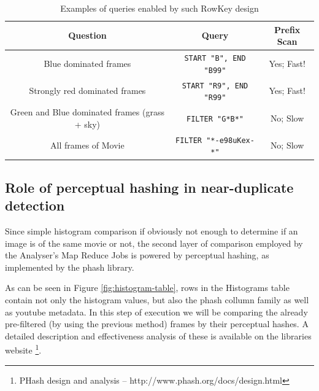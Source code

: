 \begin{table}[ch!]
  \centering
  \begin{tabular}{|c|c|c|}
  \hline
  \textbf{Question}                  & \textbf{Query}                    & Prefix Scan \\ \hline
  Blue dominated frames              & \verb|START "B", END "B99"|       & Yes; Fast! \\ \hline
  Strongly red dominated frames      & \verb|START "R9", END "R99"|      & Yes; Fast! \\ \hline
  Green and Blue dominated frames (grass + sky) & \verb|FILTER "G*B*"|   & No; Slow \\ \hline
  All frames of Movie                & \verb|FILTER "*-e98uKex-*"|       & No; Slow \\ \hline
  \end{tabular}
  \caption{Examples of queries enabled by such RowKey design}
\end{table}


\subsection{Role of perceptual hashing in near-duplicate detection}
\label{sec:perceptual-hashing}
Since simple histogram comparison if obviously not enough to determine if an image is of the same movie or not,
the second layer of comparison employed by the Analyser's Map Reduce Jobs is powered by perceptual hashing, as implemented by the phash \cite{phash} library.

As can be seen in Figure \ref{fig:histogram-table}, rows in the Histograms table contain not only the histogram values, but also the phash collumn family as well as youtube metadata. In this step of execution we will be comparing the already pre-filtered (by using the previous method) frames by their perceptual hashes. A detailed description and effectiveness analysis of these is available on the libraries website \footnote{PHash design and analysis -- http://www.phash.org/docs/design.html}.

